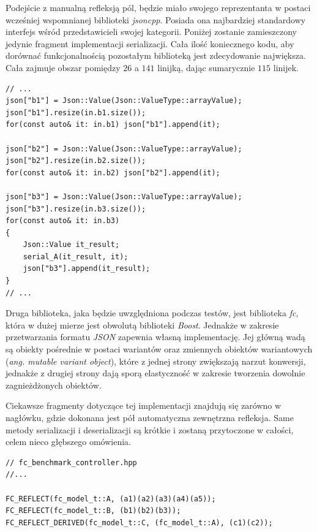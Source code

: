 \documentclass[12pt]{article}
\newcommand{\n}{\newline}
\begin{document}
{{{				Podejście z manualną refleksją pól, będzie miało swojego reprezentanta w postaci wcześniej wspomnianej biblioteki {\it jsoncpp}.
				Posiada ona najbardziej standardowy interfejs wśród przedstawicieli swojej kategorii. Poniżej zostanie zamieszczony jedynie fragment
				implementacji serializacji. Cała ilość koniecznego kodu, aby dorównać funkcjonalnością pozostałym biblioteką jest zdecydowanie
				największa. Cała zajmuje obszar pomiędzy $26$ a $141$ linijką, dając sumarycznie $115$ linijek.\n

				\begin{lstlisting}[frame=single]
// ...
json["b1"] = Json::Value(Json::ValueType::arrayValue);
json["b1"].resize(in.b1.size());
for(const auto& it: in.b1) json["b1"].append(it);

json["b2"] = Json::Value(Json::ValueType::arrayValue);
json["b2"].resize(in.b2.size());
for(const auto& it: in.b2) json["b2"].append(it);

json["b3"] = Json::Value(Json::ValueType::arrayValue);
json["b3"].resize(in.b3.size());
for(const auto& it: in.b3)
{
	Json::Value it_result;
	serial_A(it_result, it);
	json["b3"].append(it_result);
}
// ...
				\end{lstlisting}

				Druga biblioteka, jaka będzie uwzględniona podczas testów, jest biblioteka {\it fc}\cite{fc_repo}, która w dużej mierze jest obwolutą biblioteki
				{\it Boost}\cite{boost}. Jednakże w zakresie przetwarzania formatu {\it JSON} zapewnia własną implementację. Jej główną wadą są obiekty pośrednie
				w postaci wariantów oraz zmiennych obiektów wariantowych ({\it ang. mutable variant object}), które z jednej strony zwiększają narzut konwersji,
				jednakże z drugiej strony dają sporą elastyczność w zakresie tworzenia dowolnie zagnieżdżonych obiektów.\n

				Ciekawsze fragmenty dotyczące tej implementacji znajdują się zarówno w nagłówku, gdzie dokonana jest pół automatyczna zewnętrzna refleksja. Same
				metody serializacji i deserializacji są krótkie i zostaną przytoczone w całości, celem nieco głębszego omówienia.\n

				\begin{lstlisting}[frame=single]
// fc_benchmark_controller.hpp
//...

FC_REFLECT(fc_model_t::A, (a1)(a2)(a3)(a4)(a5));
FC_REFLECT(fc_model_t::B, (b1)(b2)(b3));
FC_REFLECT_DERIVED(fc_model_t::C, (fc_model_t::A), (c1)(c2));
				\end{lstlisting}

}}}
\end{document}
